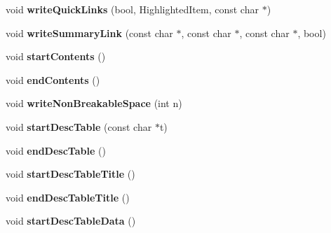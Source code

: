 \begin{DoxyCompactItemize}
\item 
\hypertarget{class_man_generator_aa2ca76705a3c909c124824bbaee17e61}{void {\bfseries write\-Quick\-Links} (bool, Highlighted\-Item, const char $\ast$)}\label{class_man_generator_aa2ca76705a3c909c124824bbaee17e61}

\item 
\hypertarget{class_man_generator_ad1487847ca7844acf3cd6b0f114b651a}{void {\bfseries write\-Summary\-Link} (const char $\ast$, const char $\ast$, const char $\ast$, bool)}\label{class_man_generator_ad1487847ca7844acf3cd6b0f114b651a}

\item 
\hypertarget{class_man_generator_a4d02a081921a34660b9f11e7c32a303f}{void {\bfseries start\-Contents} ()}\label{class_man_generator_a4d02a081921a34660b9f11e7c32a303f}

\item 
\hypertarget{class_man_generator_a89af32c9958f2fc61301a25e7b3360c7}{void {\bfseries end\-Contents} ()}\label{class_man_generator_a89af32c9958f2fc61301a25e7b3360c7}

\item 
\hypertarget{class_man_generator_a45641257483d7292885bfe860a76eefd}{void {\bfseries write\-Non\-Breakable\-Space} (int n)}\label{class_man_generator_a45641257483d7292885bfe860a76eefd}

\item 
\hypertarget{class_man_generator_a5f9cb338e3b52f56988215545549ea37}{void {\bfseries start\-Desc\-Table} (const char $\ast$t)}\label{class_man_generator_a5f9cb338e3b52f56988215545549ea37}

\item 
\hypertarget{class_man_generator_aea3e3db6190b6ec4e0f5c3988cacb40c}{void {\bfseries end\-Desc\-Table} ()}\label{class_man_generator_aea3e3db6190b6ec4e0f5c3988cacb40c}

\item 
\hypertarget{class_man_generator_a5ab1218802d388186a056cba7ea439e2}{void {\bfseries start\-Desc\-Table\-Title} ()}\label{class_man_generator_a5ab1218802d388186a056cba7ea439e2}

\item 
\hypertarget{class_man_generator_a25c810f32509fa5a79d86d96a3d4a275}{void {\bfseries end\-Desc\-Table\-Title} ()}\label{class_man_generator_a25c810f32509fa5a79d86d96a3d4a275}

\item 
\hypertarget{class_man_generator_ade74ab43d9c69e30b4344e7d176bd07e}{void {\bfseries start\-Desc\-Table\-Data} ()}\label{class_man_generator_ade74ab43d9c69e30b4344e7d176bd07e}


\end{DoxyCompactItemize}
